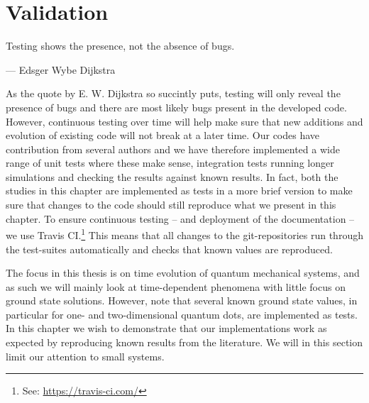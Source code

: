 \chapter{Validation}
    \label{chap:validation}
    \epigraph{Testing shows the presence, not the absence of bugs.}
    {--- Edsger Wybe Dijkstra}

    As the quote by E. W. Dijkstra so succintly puts, testing will only reveal
    the presence of bugs and there are most likely bugs present in the developed
    code.
    However, continuous testing over time will help make sure that new additions
    and evolution of existing code will not break at a later time.
    Our codes have contribution from several authors and we have therefore
    implemented a wide range of unit tests where these make sense, integration
    tests running longer simulations and checking the results against known
    results.
    In fact, both the studies in this chapter are implemented as tests in a more
    brief version to make sure that changes to the code should still reproduce
    what we present in this chapter.
    To ensure continuous testing -- and deployment of the documentation --
    we use Travis CI.\footnote{%
        See: \url{https://travis-ci.com/}
    }
    This means that all changes to the git-repositories run through the
    test-suites automatically and checks that known values are reproduced.

    The focus in this thesis is on time evolution of quantum mechanical systems,
    and as such we will mainly look at time-dependent phenomena with little
    focus on ground state solutions.
    However, note that several known ground state values, in particular for one-
    and two-dimensional quantum dots, are implemented as tests.
    In this chapter we wish to demonstrate that our implementations work as
    expected by reproducing known results from the literature.
    We will in this section limit our attention to small systems.

